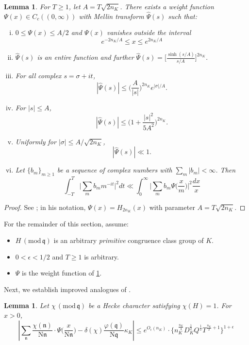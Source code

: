 \documentclass[12pt,psamsfonts]{amsart}
\newtheorem{lem}[thm]{Lemma}
\theoremstyle{definition}
\theoremstyle{remark}
\numberwithin{equation}{section}
\newcounter{notation}
\theoremstyle{plain}
\theoremstyle{remark}
\renewcommand{\1}{ {\bf 1}}
\renewcommand{\pmod}[1]{\, (\mathrm{mod} {\, #1})}
\newcommand{\kn}{\mathfrak{n}}
\newcommand{\N}{\mathrm{N}}
\newcommand{\kq}{\mathfrak{q}}
\begin{document}
\begin{lem} \label{lem:WeightFunction}
	For $T \geq 1$, let $A = T \sqrt{2n_K}$. There exists a weight function $\Psi(x) \in C_c((0,\infty))$ with Mellin transform $\widehat{\Psi}(s)$ such that:
	\begin{enumerate}[(i)]
		\item $0 \leq \Psi(x) \leq A/2$ and $\Psi(x)$ vanishes outside the interval
				\[ 
				 e^{-2n_K/A} \leq x \leq e^{2n_K/A}
				\]
		\item $\widehat{\Psi}(s)$ is an entire function and further $\widehat{\Psi}(s) = \Big[ \frac{\sinh(s/A)}{s/A} \Big]^{2n_K}$. 
		\item For all complex $s = \sigma+it$, 
			\[
				|\widehat{\Psi}(s)| \leq \Big( \frac{A}{|s|} \Big)^{2n_K} e^{|\sigma|/A}.
			\]
		\item For $|s| \leq A$,
			\[
			|\widehat{\Psi}(s)| \leq \Big(1 + \frac{|s|^2}{5A^2}\Big)^{2n_K}. 
			\]
		\item Uniformly for $|\sigma| \leq A/\sqrt{2n_K}$, 
			\[
			    |\widehat{\Psi}(s)| \ll 1.
			\]
		\item Let $\{b_m\}_{m \geq 1}$ be a sequence of complex numbers with $\sum_m |b_m| < \infty$. Then
			\[
			\int_{-T}^T \Big| \sum_m b_m m^{-it} \Big|^2 dt \ll \int_0^{\infty} \Big| \sum_m b_m \Psi\big( \frac{x}{m} \big) \Big|^2 \frac{dx}{x}
			\]
	\end{enumerate}
\end{lem}
\begin{proof}
	See \cite[Lemma 3.2 and Corollary 3.3]{Weiss}; in his notation, $\Psi(x) = H_{2n_K}(x)$ with parameter $A = T\sqrt{2n_K}$. 
\end{proof}
For the remainder of this section, assume:
  \begin{itemize}
  	\item $H \pmod{\kq}$ is an arbitrary \emph{primitive} congruence class group of $K$.
 	\vspace{1mm}
  	\item $0 < \epsilon < 1/2$ and $T \geq 1$ is arbitrary. 
  	\vspace{1mm}
  	\item $\Psi$ is the weight function of \cref{lem:WeightFunction}. 
  \end{itemize}
Next, we establish improved analogues of \cite[Lemmas 3.4 and 3.6 and Corollary 3.5]{Weiss}. 

  
\begin{lem}
\label{lem:smoothed}  Let $\chi \pmod{\kq}$ be a Hecke character satisfying $\chi(H) = 1$.   For $x > 0$,
\[
\left|\sum_{\kn}\frac{\chi(\kn)}{\N\kn}\cdot \Psi\Big(\frac{x}{\N\kn}\Big)-\delta(\chi)\frac{\varphi(\kq)}{\N\kq}\kappa_K\right|
\leq e^{O_{{\epsilon}}(n_K)} \cdot \big\{ n_K^{\frac{n_K}{4}} D_K^{\tfrac{1}{2}} Q^{\tfrac{1}{2}} T^{\tfrac{n_K}{2}+1} \big\}^{1+\epsilon}
\]
\end{lem}
\end{document}
